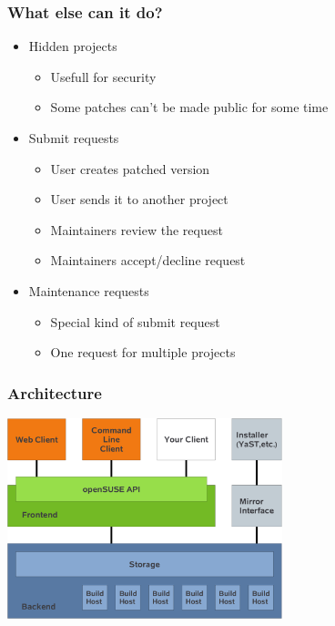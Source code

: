 \begin{frame}[t]
   \frametitle{What else can it do?}
   \begin{itemize}
      \item Hidden projects
      \begin{itemize}
         \item Usefull for security
         \item Some patches can't be made public for some time
      \end{itemize}
      \item Submit requests
      \begin{itemize}
         \item User creates patched version
         \item User sends it to another project
         \item Maintainers review the request
         \item Maintainers accept/decline request
      \end{itemize}
      \item Maintenance requests
      \begin{itemize}
         \item Special kind of submit request
         \item One request for multiple projects
      \end{itemize}
   \end{itemize}
\end{frame}


\begin{frame}
   \frametitle{Architecture}
   \begin{center}
   \includegraphics[width=8cm]{obs}
   \end{center}
\end{frame}

